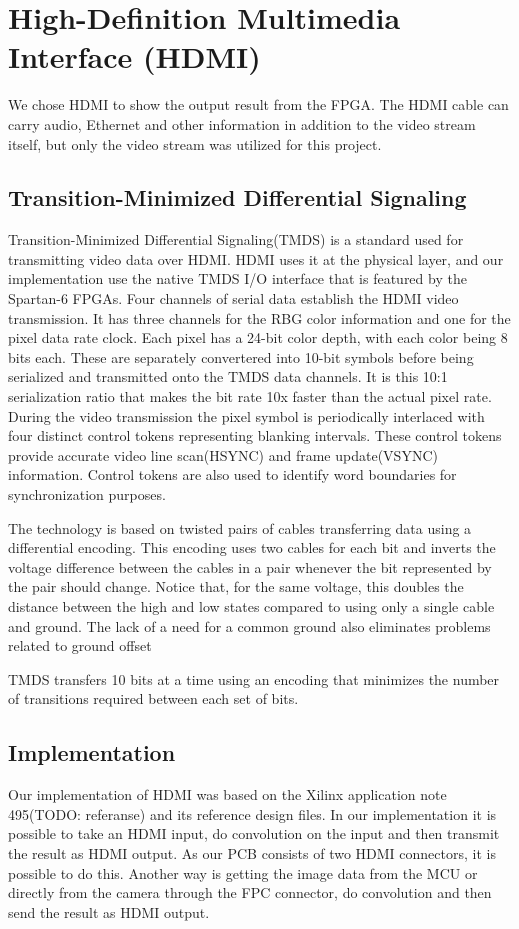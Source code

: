 \section{High-Definition Multimedia Interface (HDMI)}
We chose HDMI to show the output result from the FPGA.
The HDMI cable can carry audio, Ethernet and other information in addition to the video stream itself, but only the video stream was utilized for this project.

\subsection{Transition-Minimized Differential Signaling}
Transition-Minimized Differential Signaling(TMDS) is a standard used for transmitting video data over HDMI. HDMI uses it at the physical layer, and our implementation use the native TMDS I/O interface that is featured by the Spartan-6 FPGAs.
Four channels of serial data establish the HDMI video transmission. It has three channels for the RBG color information and one for the pixel data rate clock. Each pixel has a 24-bit color depth, with each color being 8 bits each. These are separately convertered into 10-bit symbols before being serialized and transmitted onto the TMDS data channels. It is this 10:1 serialization ratio that makes the bit rate 10x faster than the actual pixel rate. During the video transmission the pixel symbol is periodically interlaced with four distinct control tokens representing blanking intervals. These control tokens provide accurate video line scan(HSYNC) and frame update(VSYNC) information. Control tokens are also used to identify word boundaries for synchronization purposes.


The technology is based on twisted pairs of cables transferring data using a differential encoding.
This encoding uses two cables for each bit and inverts the voltage difference between the cables in a pair whenever the bit represented by the pair should change.
Notice that, for the same voltage, this doubles the distance between the high and low states compared to using only a single cable and ground.
The lack of a need for a common ground also eliminates problems related to ground offset

TMDS transfers 10 bits at a time using an encoding that minimizes the number of transitions required between each set of bits.

\subsection{Implementation}
Our implementation of HDMI was based on the Xilinx application note 495(TODO: referanse) and its reference design files. In our implementation it is possible to take an HDMI input, do convolution on the input and then transmit the result as HDMI output. As our PCB consists of two HDMI connectors, it is possible to do this. Another way is getting the image data from the MCU or directly from the camera through the FPC connector, do convolution and then send the result as HDMI output.
